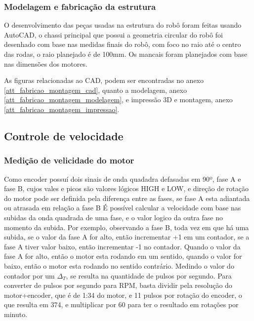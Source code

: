 	
	\subsubsection{Modelagem e fabricação da estrutura}
	
	O desenvolvimento das peças usadas na estrutura do robô foram feitas usando AutoCAD, o chassi principal que possui a geometria circular do robô foi desenhado com base nas medidas finais do robô,
	com foco no raio até o centro das rodas, o raio planejado é de 100mm. Os mancais foram planejados com base nas dimensões dos motores. 
	
	As figuras relacionadas ao CAD, podem ser encontradas no anexo \ref{att_fabricao_montagem_cad}, quanto a modelagem,
	anexo \ref{att_fabricao_montagem_modelagem}, e impressão 3D e montagem, anexo \ref{att_fabricao_montagem_impressao}.
	
	
	
	\subsection{Controle de velocidade}
	
	\subsubsection{Medição de velicidade do motor}
	
	Como encoder possuí dois sinais de onda quadadra defasadas em 90º, fase A e fase B, cujos vales e picos são valores lógicos HIGH e LOW, 
	e direção de rotação do motor pode ser definida pela diferença entre as fases, se fase A esta adiantada ou atrasada em relação a fase B
	É possível calcular a velocidade com base nas subidas da onda quadrada de uma fase, e o valor logico da outra fase no momento da subida.
	Por exemplo,  observando a fase B, toda vez em que há uma subida, se o valor da fase A for alto, então incrementar +1 em um contador, se a fase A tiver valor baixo, então incrementar -1 no contador.
	Quando o valor da fase A for alto, então o motor esta rodando em um sentido,  quando o valor  for baixo, então o motor esta rodando no sentido contrário.
	Medindo o valor do contador por um $\Delta_{T}$, se resulta na quantidade de pulsos por segundo.
	Para converter de pulsos por segundo para RPM, basta dividir pela resolução do motor+encoder,  que é de 1:34 do motor, e 11 pulsos por rotação do encoder, o que resulta em 374,
	e multiplicar por 60 para ter o resultado em rotações por minuto.
	
